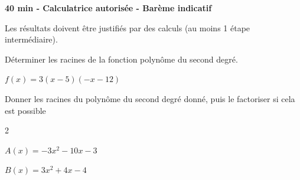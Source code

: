 \documentclass[12pt,a4paper]{article}  %
\begin{document}
\begin{center}

\end{center}


\begin{center}\textbf{40 min - Calculatrice autorisée - Barème indicatif}\end{center}


\begin{center}
Les résultats doivent être justifiés par des calculs (au moins 1 étape intermédiaire).
\end{center}
\vspace{.05cm} 


Déterminer les racines de la fonction polynôme du second degré.
\begin{enumMet}
    \item $f(x)=3(x-5)(-x-12)$
\end{enumMet}

\vspace{-0.3cm}

Donner les racines du polynôme du second degré donné, puis le factoriser si cela est possible
\begin{multicols}{2}
\begin{enumMet}
    \item $A(x)=-3x^{2}-10 x-3$
    \item $B(x)=3x^{2}+4x-4$
\end{enumMet}
\end{multicols}

\vspace{-0.3cm}
\end{document}
